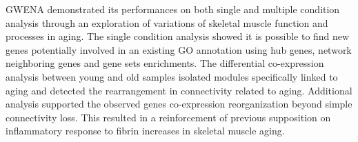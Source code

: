 GWENA demonstrated its performances on both single and multiple condition analysis through an exploration of variations of skeletal muscle function and processes in aging. The single condition analysis showed it is possible to find new genes potentially involved in an existing GO annotation using hub genes, network neighboring genes and gene sets enrichments. The differential co-expression analysis between young and old samples isolated modules specifically linked to aging and detected the rearrangement in connectivity related to aging. Additional analysis supported the observed genes co-expression reorganization beyond simple connectivity loss. This resulted in a reinforcement of previous supposition on inflammatory response to fibrin increases in skeletal muscle aging.	



